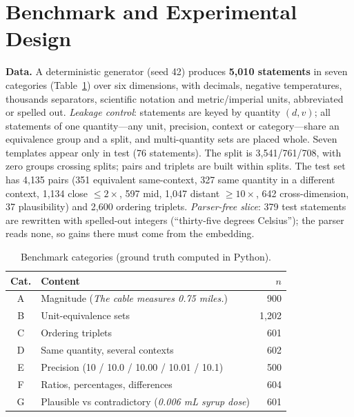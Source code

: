 \documentclass[conference]{IEEEtran}
\begin{document}
\section{Benchmark and Experimental Design}
\label{sec:design}
\textbf{Data.} A deterministic generator (seed 42) produces \textbf{5{,}010 statements} in seven categories
(Table~\ref{tab:data}) over six dimensions, with decimals, negative temperatures, thousands separators, scientific
notation and metric/imperial units, abbreviated or spelled out.
\emph{Leakage control}: statements are keyed by quantity $(d,v)$; all statements of one quantity---any unit, precision,
context or category---share an equivalence group and a split, and multi-quantity sets are placed whole. Seven
templates appear only in test (76 statements). The split is 3{,}541/761/708, with zero groups crossing splits; pairs
and triplets are built within splits. The test set has 4{,}135 pairs (351 equivalent same-context, 327 same quantity
in a different context, 1{,}134 close $\le2\times$, 597 mid, 1{,}047 distant $\ge10\times$, 642 cross-dimension, 37
plausibility) and 2{,}600 ordering triplets.
\emph{Parser-free slice}: 379 test statements are rewritten with spelled-out integers (``thirty-five degrees
Celsius''); the parser reads none, so gains there must come from the embedding.

\begin{table}[t]
\centering\footnotesize
\caption{Benchmark categories (ground truth computed in Python).}
\label{tab:data}
\begin{tabular}{@{}clr@{}}
\toprule
Cat. & Content & $n$ \\
\midrule
A & Magnitude (\textit{The cable measures 0.75 miles.}) & 900 \\
B & Unit-equivalence sets & 1{,}202 \\
C & Ordering triplets & 601 \\
D & Same quantity, several contexts & 602 \\
E & Precision (10 / 10.0 / 10.00 / 10.01 / 10.1) & 500 \\
F & Ratios, percentages, differences & 604 \\
G & Plausible vs contradictory (\textit{0.006 mL syrup dose}) & 601 \\
\bottomrule
\end{tabular}
\end{table}
\end{document}
